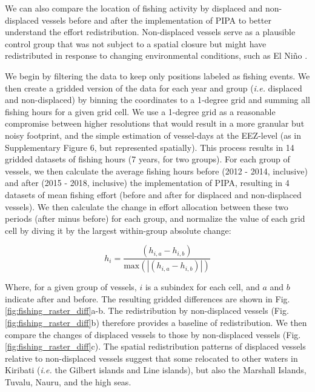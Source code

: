 \documentclass[12pt]{article}
\begin{document}
We can also compare the location of fishing activity by displaced and non-displaced vessels before and after the implementation of PIPA to better understand the effort redistribution. Non-displaced vessels serve as a plausible control group that was not subject to a spatial closure but might have redistributed in response to changing environmental conditions, such as El Ni\~no \cite{hanich2018unraveling,aqorau_2018}.

We begin by filtering the data to keep only positions labeled as fishing events. We then create a gridded version of the data for each year and group (\emph{i.e.} displaced and non-displaced) by binning the coordinates to a 1-degree grid and summing all fishing hours for a given grid cell. We use a 1-degree grid as a reasonable compromise between higher resolutions that would result in a more granular but noisy footprint, and the simple estimation of vessel-days at the EEZ-level (as in Supplementary Figure 6, but represented spatially). This process results in 14 gridded datasets of fishing hours (7 years, for two groups). For each group of vessels, we then calculate the average fishing hours before (2012 - 2014, inclusive) and after (2015 - 2018, inclusive) the implementation of PIPA, resulting in 4 datasets of mean fishing effort (before and after for displaced and non-displaced vessels). We then calculate the change in effort allocation between these two periods (after minus before) for each group, and normalize the value of each grid cell by diving it by the largest within-group absolute change:

\begin{equation}
h_i = \frac{(h_{i, a} - h_{i, b})}{\mathrm{max}(|(h_{i, a} - h_{i, b})|)}
\end{equation}

Where, for a given group of vessels, $i$ is a subindex for each cell, and $a$ and $b$ indicate after and before. The resulting gridded differences are shown in Fig. \ref{fig:fishing_raster_diff}a-b. The redistribution by non-displaced vessels (Fig. \ref{fig:fishing_raster_diff}b) therefore provides a baseline of redistribution. We then compare the changes of displaced vessels to those by non-displaced vessels (Fig. \ref{fig:fishing_raster_diff}c). The spatial redistribution patterns of displaced vessels relative to non-displaced vessels suggest that some relocated to other waters in Kiribati (\emph{i.e.} the Gilbert islands and Line islands), but also the Marshall Islands, Tuvalu, Nauru, and the high seas.
\end{document}
